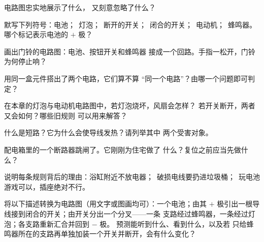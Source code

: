 \begin{exercise}[$\star$]\label{exo:g6:circuits-and-safety:1}
电路图忠实地展示了什么，
又刻意忽略了什么？
\end{exercise}

\begin{exercise}[$\star$]\label{exo:g6:circuits-and-safety:2}
默写下列符号：电池；\ 灯泡；\ 断开的开关；\
闭合的开关；\ 电动机；\ 蜂鸣器。哪个标记表示电池的
$+$ 极？
\end{exercise}

\begin{exercise}[$\star$]\label{exo:g6:circuits-and-safety:3}
画出门铃的电路图：电池、按钮开关和蜂鸣器
接成一个回路。手指一松开，门铃为何停止响？
\end{exercise}

\begin{exercise}[$\star$]\label{exo:g6:circuits-and-safety:4}
用同一盒元件搭出了两个电路，它们算不算
“同一个电路”？由哪一个问题即可判定？
\end{exercise}

\begin{exercise}[$\star$]\label{exo:g6:circuits-and-safety:5}
在本章的灯泡与电动机电路图中，若灯泡烧坏，风扇会怎样？
若开关断开，两者又会如何？哪些旧规则
可以用来解答？
\end{exercise}

\begin{exercise}[$\star$]\label{exo:g6:circuits-and-safety:6}
什么是短路？它为什么会使导线发热？请列举其中
两个受害对象。
\end{exercise}

\begin{exercise}[$\star$]\label{exo:g6:circuits-and-safety:7}
配电箱里的一个断路器跳闸了。它刚刚为住宅做了
什么？复位之前应当先做什么？
\end{exercise}

\begin{exercise}[$\star$]\label{exo:g6:circuits-and-safety:8}
说明每条规则背后的理由：浴缸附近不放电器；\
破损电线要扔进垃圾桶；\ 玩电池游戏可以，插座绝对不行。
\end{exercise}

\begin{exercise}[$\star\star$]\label{exo:g6:circuits-and-safety:9}
将以下描述转换为电路图（用文字或图画均可）：一个电池；由其
$+$ 极引出一根导线接到闭合的开关；由开关分出一个分叉——一条
支路经过蜂鸣器，一条经过灯泡；各支路重新汇合并回到 $-$ 极。
预测能听到什么、看到什么，以及若
只给蜂鸣器所在的支路再单独加装一个开关并断开，会有什么变化？
\end{exercise}

